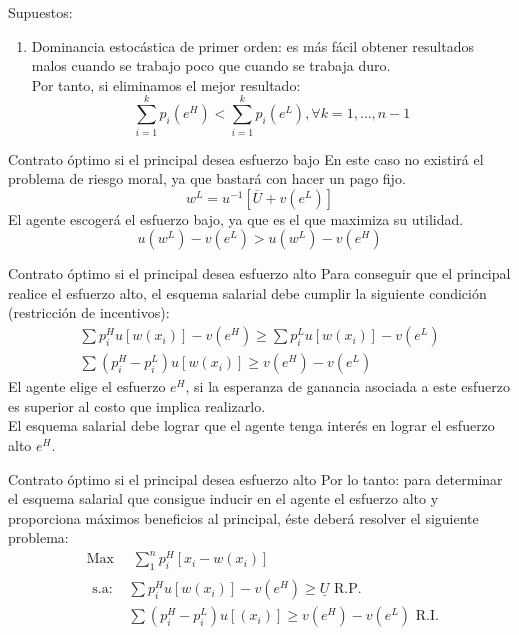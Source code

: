 \begin{frame}{Supuestos:}
	\begin{enumerate}[6]
		\item Dominancia estocástica de primer orden: es más fácil obtener resultados malos cuando se trabajo poco que cuando se trabaja duro.\\
		Por tanto, si eliminamos el mejor resultado:
			$$\sum_{i=1}^{k}p_i\left( e^H\right) < \sum_{i=1}^{k}p_i\left( e^L\right) , \forall k = 1, \ldots, n-1$$
	\end{enumerate}
\end{frame}
\begin{frame}{Contrato óptimo si el principal desea esfuerzo bajo}
	En este caso no existirá el problema de riesgo moral, ya que bastará con hacer un pago fijo.
		$$w^L = u^{-1}\left[ \overline{U} + v\left(e^L \right) \right]$$
	El agente escogerá el esfuerzo bajo, ya que es el que maximiza su utilidad.
		$$u\left( w^L\right) - v\left( e^L\right) > u\left( w^L\right) - v\left( e^H\right) $$
\end{frame}
\begin{frame}{Contrato óptimo si el principal desea esfuerzo alto}
	Para conseguir que el principal realice el esfuerzo alto, el esquema salarial debe cumplir la siguiente condición (restricción de incentivos):
		\begin{gather*}
			\sum p_{i}^{H}u\left[w(x_i) \right] - v\left( e^H\right) \geq \sum p_{i}^Lu\left[ w\left( x_i\right) \right] - v\left( e^L\right)\\
			\sum \left( p_{i}^{H} - p_{i}^{L}\right) u\left[ w\left( x_i\right) \right] \geq v\left( e^H\right) - v\left( e^L\right) 
		\end{gather*}
	El agente elige el esfuerzo $e^H$, si la esperanza de ganancia asociada a este esfuerzo es superior al costo que implica realizarlo.\\
	
	El esquema salarial debe lograr que el agente tenga interés en lograr el esfuerzo alto $e^H$.
\end{frame}
\begin{frame}{Contrato óptimo si el principal desea esfuerzo alto}
	Por lo tanto: para determinar el esquema salarial que consigue inducir en el agente el esfuerzo alto y proporciona máximos beneficios al principal, éste deberá resolver el siguiente problema:
		\begin{align*}
			& \text{Max } \quad \sum_{1}^{n}p_{i}^{H}\left[x_i - w\left( x_i\right) \right] \\
			& \begin{array}{ll}
				\text{s.a: } & \sum p_{i}^{H} u\left[ w\left( x_i\right) \right] - v\left( e^H \right) \geq \underline{U} \text{ R.P.}\\[0.3cm]
						     & \sum\left( p_{i}^{H} - p_{i}^{L}\right) u\left[ \left(x_i \right) \right] \geq v\left( e^H\right) - v\left( e^L\right)  \text{ R.I.}
			\end{array}
		\end{align*}
\end{frame}
